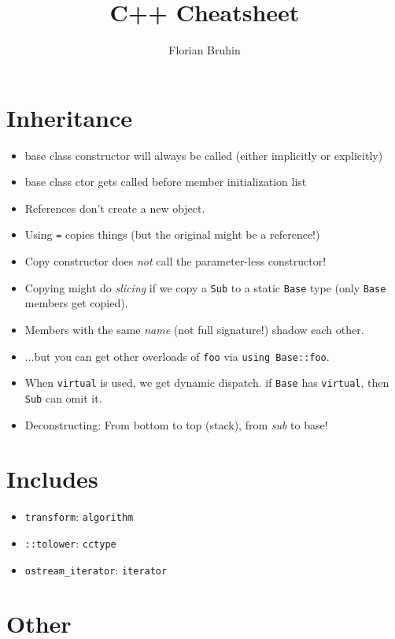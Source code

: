 \documentclass[a4paper,12pt]{article}
\begin{document}
\title{C++ Cheatsheet}
\author{Florian Bruhin}
\maketitle

\section{Inheritance}

\begin{itemize}
  \item base class constructor will always be called (either implicitly or explicitly)
  \item base class ctor gets called before member initialization list
  \item References don't create a new object.
  \item Using \verb|=| copies things (but the original might be a reference!)
  \item Copy constructor does \emph{not} call the parameter-less constructor!
  \item Copying might do \emph{slicing} if we copy a \verb|Sub| to a static
    \verb|Base| type (only \verb|Base| members get copied).
  \item Members with the same \emph{name} (not full signature!) shadow each
    other.
  \item ...but you can get other overloads of \verb|foo| via \verb|using Base::foo|.
  \item When \verb|virtual| is used, we get dynamic dispatch. if \verb|Base| has
    \verb|virtual|, then \verb|Sub| can omit it.
  \item Deconstructing: From bottom to top (stack), from \emph{sub} to base!
\end{itemize}

\section{Includes}

\begin{itemize}
\item \verb|transform|: \verb|algorithm|
\item \verb|::tolower|: \verb|cctype|
\item \verb|ostream_iterator|: \verb|iterator|
\end{itemize}

\section{Other}
\end{document}
